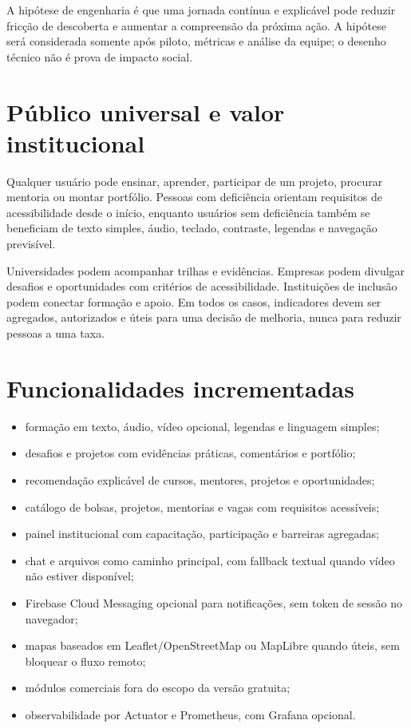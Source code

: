 A hipótese de engenharia é que uma jornada contínua e explicável pode reduzir fricção de descoberta e aumentar a compreensão da próxima ação. A hipótese será considerada somente após piloto, métricas e análise da equipe; o desenho técnico não é prova de impacto social.

\section{Público universal e valor institucional}

Qualquer usuário pode ensinar, aprender, participar de um projeto, procurar mentoria ou montar portfólio. Pessoas com deficiência orientam requisitos de acessibilidade desde o início, enquanto usuários sem deficiência também se beneficiam de texto simples, áudio, teclado, contraste, legendas e navegação previsível.

Universidades podem acompanhar trilhas e evidências. Empresas podem divulgar desafios e oportunidades com critérios de acessibilidade. Instituições de inclusão podem conectar formação e apoio. Em todos os casos, indicadores devem ser agregados, autorizados e úteis para uma decisão de melhoria, nunca para reduzir pessoas a uma taxa.

\section{Funcionalidades incrementadas}

\begin{itemize}
  \item formação em texto, áudio, vídeo opcional, legendas e linguagem simples;
  \item desafios e projetos com evidências práticas, comentários e portfólio;
  \item recomendação explicável de cursos, mentores, projetos e oportunidades;
  \item catálogo de bolsas, projetos, mentorias e vagas com requisitos acessíveis;
  \item painel institucional com capacitação, participação e barreiras agregadas;
  \item chat e arquivos como caminho principal, com fallback textual quando vídeo não estiver disponível;
  \item Firebase Cloud Messaging opcional para notificações, sem token de sessão no navegador;
  \item mapas baseados em Leaflet/OpenStreetMap ou MapLibre quando úteis, sem bloquear o fluxo remoto;
  \item módulos comerciais fora do escopo da versão gratuita;
  \item observabilidade por Actuator e Prometheus, com Grafana opcional.
\end{itemize}

